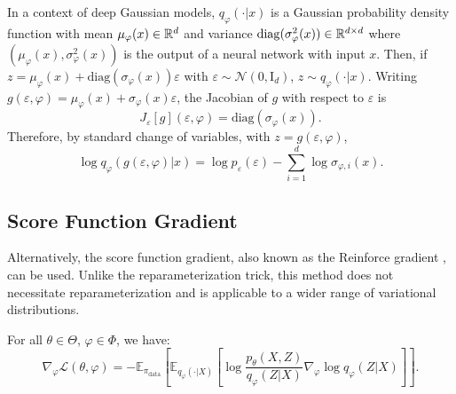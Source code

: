 \documentclass[english,graybox,envcountchap,envcountsame,sectrefs,shortlabels]{svmono}
\theoremstyle{style}
\newcommand{\Id}{\mathrm{I}}
\newcommand{\eqsp}{}
\newcommand{\diag}{\mathrm{diag}}
\begin{document}
\begin{example}
In a context of deep Gaussian models, $q_{\varphi}(\cdot|x)$ is a Gaussian probability density function with mean $\mu_{\varphi}(x)\in\mathbb{R}^d$ and variance $\diag(\sigma_{\varphi}^2(x))\in\rset^{d\times d}$ where $(\mu_{\varphi}(x),\sigma_{\varphi}^2(x))$ is the output of a neural network with input $x$. Then, if $z = \mu_{\varphi}(x) + \diag(\sigma_{\varphi}(x))\varepsilon$ with $\varepsilon \sim \mathcal{N}(0,\Id_d)$, $z\sim q_{\varphi}(\cdot|x)$. Writing $g(\varepsilon, \varphi) = \mu_{\varphi}(x) + \sigma_{\varphi}(x)\varepsilon$, the Jacobian of $g$ with respect to $\varepsilon$ is
$$
J_\varepsilon[g](\varepsilon, \varphi) = \diag(\sigma_{\varphi}(x))\eqsp.
$$
Therefore, by standard change of variables, with $z=g(\varepsilon, \varphi)$,
$$
\log q_{\varphi}(g(\varepsilon, \varphi) | x) = \log p_\varepsilon(\varepsilon) - \sum_{i=1}^{d}\log \sigma_{\varphi,i}(x)\eqsp.
$$  
\end{example}

\subsection{Score Function Gradient}
Alternatively, the score function gradient, also known as the Reinforce gradient \cite{glynn1990likelihood, williams1992simple,paisley2012variational}, can be used. Unlike the reparameterization trick, this method does not necessitate reparameterization and is applicable to a wider range of variational distributions. 
\begin{proposition}\label{prop:score_estimator}
For all $\theta \in \Theta$, $\varphi \in \Phi$, we have:
$$
\nabla^{}_{\varphi} \mathcal{L}(\theta, \varphi) = -\mathbb{E}_{\pi_{\mathrm{data}}}\left[ \mathbb{E}_{q_{\varphi}(\cdot|X)}\left[ \log \frac{p_{\theta}(X, Z)}{q_{\varphi}(Z | X)} \nabla_{\varphi} \log q_{\varphi}(Z | X) \right] \right]\eqsp.
$$
\end{proposition}

\end{document}
